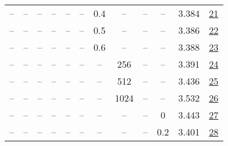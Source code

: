 \begin{table}[H]
\begin{tabular}{cccccccccccc}
-- & -- & -- & -- & -- & -- & 0.4 & -- & -- & -- & 3.384 & \href{https://wandb.ai/stanford-mercury/optimizer-scaling/runs/sweep-130m-5B-scion11cb39lr0.016-wd0.1-minlr0-warmup0-b10.95-gn1-7d2058}{21} \\
-- & -- & -- & -- & -- & -- & 0.5 & -- & -- & -- & 3.386 & \href{https://wandb.ai/stanford-mercury/optimizer-scaling/runs/sweep-130m-5B-scione17102lr0.016-wd0.1-minlr0-warmup0-b10.95-gn1-a96653}{22} \\
-- & -- & -- & -- & -- & -- & 0.6 & -- & -- & -- & 3.388 & \href{https://wandb.ai/stanford-mercury/optimizer-scaling/runs/sweep-130m-5B-scionf605fclr0.016-wd0.1-minlr0-warmup0-b10.95-gn1-ae9ebc}{23} \\
-- & -- & -- & -- & -- & -- & -- & 256 & -- & -- & 3.391 & \href{https://wandb.ai/stanford-mercury/optimizer-scaling/runs/sweep-130m-5B-scion949b38lr0.016-wd0.1-minlr0-warmup0-b10.95-gn1-1d499a}{24} \\
-- & -- & -- & -- & -- & -- & -- & 512 & -- & -- & 3.436 & \href{https://wandb.ai/stanford-mercury/optimizer-scaling/runs/sweep-130m-5B-scion697cdelr0.016-wd0.1-minlr0-warmup0-b10.95-gn1-228b44}{25} \\
-- & -- & -- & -- & -- & -- & -- & 1024 & -- & -- & 3.532 & \href{https://wandb.ai/stanford-mercury/optimizer-scaling/runs/sweep-130m-5B-scion6ff86alr0.016-wd0.1-minlr0-warmup0-b10.95-gn1-31315c}{26} \\
-- & -- & -- & -- & -- & -- & -- & -- & -- & 0 & 3.443 & \href{https://wandb.ai/stanford-mercury/optimizer-scaling/runs/sweep-130m-5B-scion12ea16lr0.016-wd0-minlr0-warmup0-b10.95-gn1-s-98cd4d}{27} \\
-- & -- & -- & -- & -- & -- & -- & -- & -- & 0.2 & 3.401 & \href{https://wandb.ai/stanford-mercury/optimizer-scaling/runs/sweep-130m-5B-scion03a52blr0.016-wd0.2-minlr0-warmup0-b10.95-gn1-a7350e}{28} \\
\bottomrule
\end{tabular}
\end{table}

